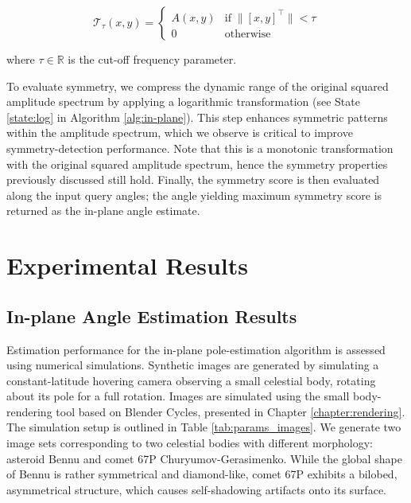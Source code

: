 \begin{equation}
\label{eq:low_pass_filt}
    \mathcal{T}_\tau(x,y) =
    \begin{cases}
        A(x,y) & \text{if} \; \lVert [x,y]^\top \rVert < \tau \\
        0 & \text{otherwise}
    \end{cases}
\end{equation}

where $\tau \in \mathbb{R}$ is the cut-off frequency parameter.

To evaluate symmetry, we compress the dynamic range of the original squared amplitude spectrum by applying a logarithmic transformation (see State \ref{state:log} in Algorithm \ref{alg:in-plane}). This step enhances symmetric patterns within the amplitude spectrum, which we observe is critical to improve symmetry-detection performance. Note that this is a monotonic transformation with the original squared amplitude spectrum, hence the symmetry properties previously discussed still hold. Finally, the symmetry score is then evaluated along the input query angles; the angle yielding maximum symmetry score is returned as the in-plane angle estimate.


\section{Experimental Results}
\label{sec:results}

\subsection{In-plane Angle Estimation Results}
\label{sec:in_plane_est}

Estimation performance for the in-plane pole-estimation algorithm is assessed using numerical simulations. Synthetic images are generated by simulating a constant-latitude hovering camera observing a small celestial body, rotating about its pole for a full rotation. Images are simulated using the small body-rendering tool based on Blender Cycles, presented in Chapter \ref{chapter:rendering}. The simulation setup is outlined in Table \ref{tab:params_images}. We generate two image sets corresponding to two celestial bodies with different morphology: asteroid Bennu \cite{lauretta2019unexpected} and comet 67P Churyumov-Gerasimenko\cite{thomas2015morphological}. While the global shape of Bennu is rather symmetrical and diamond-like, comet 67P exhibits a bilobed, asymmetrical structure, which causes self-shadowing artifacts onto its surface.

